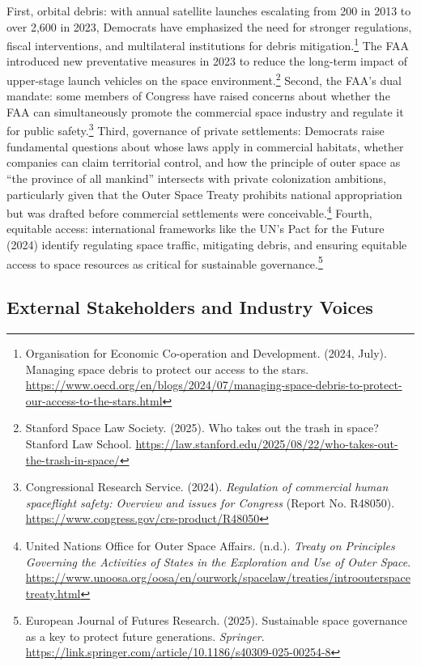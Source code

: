 First, orbital debris: with annual satellite launches escalating from 200 in 2013 to over 2,600 in 2023, Democrats have emphasized the need for stronger regulations, fiscal interventions, and multilateral institutions for debris mitigation.\footnote{Organisation for Economic Co-operation and Development. (2024, July). Managing space debris to protect our access to the stars. \url{https://www.oecd.org/en/blogs/2024/07/managing-space-debris-to-protect-our-access-to-the-stars.html}} The FAA introduced new preventative measures in 2023 to reduce the long-term impact of upper-stage launch vehicles on the space environment.\footnote{Stanford Space Law Society. (2025). Who takes out the trash in space? Stanford Law School. \url{https://law.stanford.edu/2025/08/22/who-takes-out-the-trash-in-space/}} Second, the FAA’s dual mandate: some members of Congress have raised concerns about whether the FAA can simultaneously promote the commercial space industry and regulate it for public safety.\footnote{Congressional Research Service. (2024). \emph{Regulation of commercial human spaceflight safety: Overview and issues for Congress} (Report No. R48050). \url{https://www.congress.gov/crs-product/R48050}} Third, governance of private settlements: Democrats raise fundamental questions about whose laws apply in commercial habitats, whether companies can claim territorial control, and how the principle of outer space as “the province of all mankind” intersects with private colonization ambitions, particularly given that the Outer Space Treaty prohibits national appropriation but was drafted before commercial settlements were conceivable.\footnote{United Nations Office for Outer Space Affairs. (n.d.). \emph{Treaty on Principles Governing the Activities of States in the Exploration and Use of Outer Space}. \url{https://www.unoosa.org/oosa/en/ourwork/spacelaw/treaties/introouterspacetreaty.html}} Fourth, equitable access: international frameworks like the UN’s Pact for the Future (2024) identify regulating space traffic, mitigating debris, and ensuring equitable access to space resources as critical for sustainable governance.\footnote{European Journal of Futures Research. (2025). Sustainable space governance as a key to protect future generations. \emph{Springer}. \url{https://link.springer.com/article/10.1186/s40309-025-00254-8}}

\subsection{External Stakeholders and Industry Voices}

